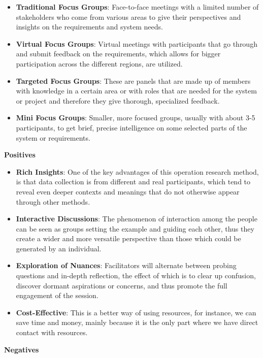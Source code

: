 \documentclass[conference]{IEEEtran}
\begin{document}
\begin{itemize}
    \item \textbf{Traditional Focus Groups}: Face-to-face meetings with a limited number of stakeholders who come from various areas to give their perspectives and insights on the requirements and system needs.
    \item \textbf{Virtual Focus Groups}: Virtual meetings with participants that go through and submit feedback on the requirements, which allows for bigger participation across the different regions, are utilized.
    \item \textbf{Targeted Focus Groups}: These are panels that are made up of members with knowledge in a certain area or with roles that are needed for the system or project and therefore they give thorough, specialized feedback.
    \item \textbf{Mini Focus Groups}: Smaller, more focused groups, usually with about 3-5 participants, to get brief, precise intelligence on some selected parts of the system or requirements.
\end{itemize}

\textbf{Positives}

\begin{itemize}
    \item \textbf{Rich Insights}: One of the key advantages of this operation research method, is that data collection is from different and real participants, which tend to reveal even deeper contexts and meanings that do not otherwise appear through other methods.
    \item \textbf{Interactive Discussions}: The phenomenon of interaction among the people can be seen as groups setting the example and guiding each other, thus they create a wider and more versatile perspective than those which could be generated by an individual.
    \item \textbf{Exploration of Nuances}: Facilitators will alternate between probing questions and in-depth reflection, the effect of which is to clear up confusion, discover dormant aspirations or concerns, and thus promote the full engagement of the session.
    \item \textbf{Cost-Effective}: This is a better way of using resources, for instance, we can save time and money, mainly because it is the only part where we have direct contact with resources.
\end{itemize}

\textbf{Negatives}
\end{document}
